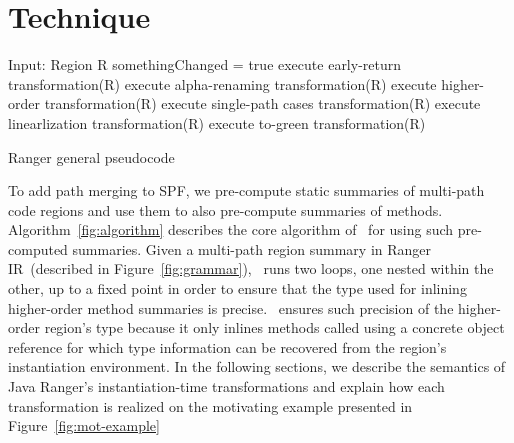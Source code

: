 \section{Technique}
\label{sec:technique}
%
\begin{algorithm}[]
\SetAlgoLined
Input: Region R\;
 somethingChanged = true\;
 execute early-return transformation(R)\;
 execute alpha-renaming transformation(R)\;
 {
	execute higher-order transformation(R)\;}
execute single-path cases transformation(R)\;
execute linearlization transformation(R)\;
execute to-green transformation(R)\;
\caption{Ranger general pseudocode}
\label{fig:algorithm}
\end{algorithm}
%
To add path merging to SPF, we pre-compute static summaries of multi-path code regions and use them to also pre-compute
summaries of methods.
%
Algorithm~\ref{fig:algorithm} describes the core algorithm of \tool\ for using such pre-computed summaries.
%
Given a multi-path region summary in Ranger IR~(described in Figure~\ref{fig:grammar}), \tool\
runs two loops, one nested within the other, up to a fixed point in order to ensure that the type
used for inlining higher-order method summaries is precise.
%
\tool\ ensures such precision of the higher-order region\rq s type because it only inlines methods called using a concrete object
reference for which type information can be recovered from the region\rq s instantiation environment.
%
In the following sections, we describe the semantics of Java Ranger\rq s instantiation-time transformations
and explain how each transformation is realized on the motivating example presented in Figure~\ref{fig:mot-example}
%
%
%
